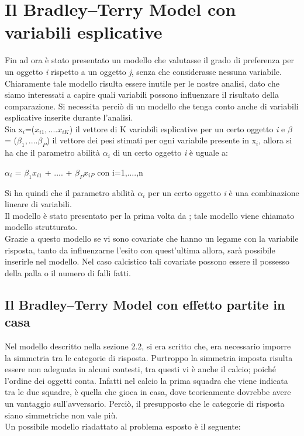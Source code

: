 \section{Il Bradley–Terry Model con variabili esplicative}
Fin ad ora è stato presentato un modello che valutasse il grado di preferenza per un oggetto \textit{i} rispetto a un oggetto \textit{j}, senza che considerasse nessuna variabile. Chiaramente tale modello risulta essere inutile per le nostre analisi, dato che siamo interessati a capire quali variabili possono influenzare il risultato della comparazione. Si necessita perciò di un modello che tenga conto anche di variabili esplicative inserite durante l'analisi. \\
Sia x$_{i}$=($x_{i1},....x_{iK}$) il vettore di K variabili esplicative per un certo oggetto \textit{i} e $\beta$ = ($\beta_{1},....\beta_{P}$) il vettore dei pesi stimati per ogni variabile presente in x$_{i}$, allora si ha che il parametro abilità $\alpha_{i}$ di un certo oggetto \textit{i} è uguale a:

\begin{center}
	\begin{large}
	 $\alpha_{i}$ = $\beta_{1}x_{i1}$ + .... + $\beta_{P}x_{iP}$      con i=1,....,n
	\end{large}

\end{center}

Si ha quindi che il parametro abilità $\alpha_{i}$ per un certo oggetto \textit{i} è una combinazione lineare di variabili.\\
Il modello è stato presentato per la prima volta da \autocite{springall1973response}; tale modello viene chiamato modello strutturato.\\
 
Grazie a questo modello se vi sono covariate che hanno un legame con la variabile risposta, tanto da influenzarne l'esito con quest'ultima allora, sarà possibile inserirle nel modello. Nel caso calcistico tali covariate possono essere il possesso della palla o il numero di falli fatti.


\subsection{Il Bradley–Terry Model con effetto partite in casa}
Nel modello descritto nella sezione 2.2, si era scritto che, era necessario imporre la simmetria tra le categorie di risposta. Purtroppo la simmetria imposta risulta essere non adeguata in alcuni contesti, tra questi vi è anche il calcio; poiché l'ordine dei oggetti conta. Infatti nel calcio la prima squadra che viene indicata tra le due squadre, è quella che gioca in casa, dove teoricamente dovrebbe avere un vantaggio sull'avversario. Perciò, il presupposto che le categorie di risposta siano simmetriche non vale più. \\
Un possibile modello riadattato al problema esposto è il seguente:

